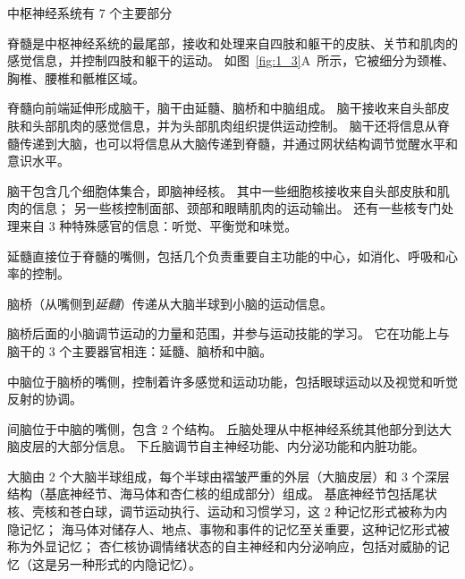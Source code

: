 \begin{proposition}[中枢神经系统的解剖学组织] \label{box:1_2}
	中枢神经系统有 7 个主要部分
	
	\quad \quad \textcolor[HTML]{00AEF7}{脊髓}是中枢神经系统的最尾部，接收和处理来自四肢和躯干的皮肤、关节和肌肉的感觉信息，并控制四肢和躯干的运动。
	如图~\ref{fig:1_3}A~所示，它被细分为颈椎、胸椎、腰椎和骶椎区域。
	
	\quad \quad 脊髓向前端延伸形成\textcolor[HTML]{00AEF7}{脑干}，脑干由延髓、脑桥和中脑组成。
	脑干接收来自头部皮肤和头部肌肉的感觉信息，并为头部肌肉组织提供运动控制。
	脑干还将信息从脊髓传递到大脑，也可以将信息从大脑传递到脊髓，并通过网状结构调节觉醒水平和意识水平。
	
	\quad \quad 脑干包含几个细胞体集合，即脑神经核。
	其中一些细胞核接收来自头部皮肤和肌肉的信息；
	另一些核控制面部、颈部和眼睛肌肉的运动输出。
	还有一些核专门处理来自 3 种特殊感官的信息：听觉、平衡觉和味觉。
	
	\quad \quad \textcolor[HTML]{00AEF7}{延髓}直接位于脊髓的嘴侧，包括几个负责重要自主功能的中心，如消化、呼吸和心率的控制。
	
	\quad \quad \textcolor[HTML]{00AEF7}{脑桥}（从嘴侧到\textit{延髓}）传递从大脑半球到小脑的运动信息。
	
	\quad \quad 脑桥后面的\textcolor[HTML]{00AEF7}{小脑}调节运动的力量和范围，并参与运动技能的学习。
	它在功能上与脑干的 3 个主要器官相连：延髓、脑桥和中脑。
	
	\quad \quad \textcolor[HTML]{00AEF7}{中脑}位于脑桥的嘴侧，控制着许多感觉和运动功能，包括眼球运动以及视觉和听觉反射的协调。
	
	\quad \quad \textcolor[HTML]{00AEF7}{间脑}位于中脑的嘴侧，包含 2 个结构。
	丘脑处理从中枢神经系统其他部分到达大脑皮层的大部分信息。
	下丘脑调节自主神经功能、内分泌功能和内脏功能。
	
	\quad \quad \textcolor[HTML]{00AEF7}{大脑}由 2 个大脑半球组成，每个半球由褶皱严重的外层（大脑皮层）和 3 个深层结构（基底神经节、海马体和杏仁核的组成部分）组成。
	基底神经节包括尾状核、壳核和苍白球，调节运动执行、运动和习惯学习，这 2 种记忆形式被称为内隐记忆；
	海马体对储存人、地点、事物和事件的记忆至关重要，这种记忆形式被称为外显记忆；
	杏仁核协调情绪状态的自主神经和内分泌响应，包括对威胁的记忆（这是另一种形式的内隐记忆）。
	

\end{proposition}
